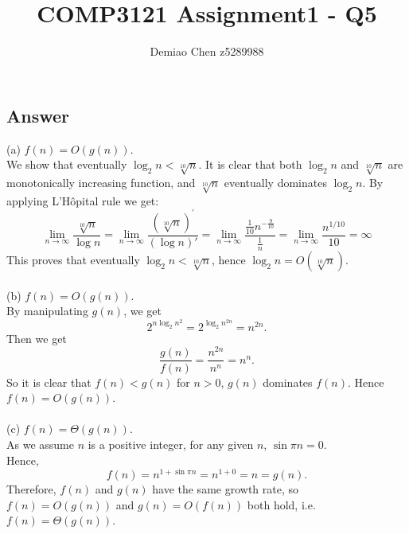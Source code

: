\documentclass[12pt]{article}
\title{COMP3121 Assignment1 - Q5}
\author{Demiao Chen z5289988}
\begin{document}
\maketitle
{}

\subsection*{Answer}
(a) $f(n) = O(g(n)).$\\
We show that eventually $\log_2{n} < \sqrt[10]{n}$. It is clear 
that both $\log_2{n}$ and $\sqrt[10]{n}$ are monotonically increasing function,
and $\sqrt[10]{n}$ eventually dominates $\log_2{n}$. By applying L’Hôpital rule
we get:
$$
\lim_{n \to \infty} \frac{\sqrt[10]{n}}{\log{n}} = 
\lim_{n \to \infty} \frac{(\sqrt[10]{n})^\prime}{(\log{n})'}=
\lim_{n \to \infty} \frac{\frac{1}{10}n^{-\frac{9}{10}}}{\frac{1}{n}}=
\lim_{n \to \infty} \frac{n^{1/10}}{10}=
\infty
$$
This proves that eventually $\log_2{n} < \sqrt[10]{n}$, hence 
$\log_2{n} = O(\sqrt[10]{n})$.
\\\\
(b) $f(n) = O(g(n))$. \\
By manipulating $g(n)$, we get $$
2^{n\log_2{n^2}} = 2^{\log_2{n^{2n}}} = n^{2n}.
$$
Then we get $$
\frac{g(n)}{f(n)} = \frac{n^{2n}}{n^n} = n^n.
$$
So it is clear that $f(n) < g(n)$ for $n>0$, $g(n)$ dominates $f(n)$.
Hence $f(n) = O(g(n))$.
\\\\
(c) $f(n) = \Theta (g(n))$. \\
As we assume $n$ is a positive integer, for any given $n$,
$\sin {\pi n} = 0$. \\
Hence, $$f(n) = n ^ {1 + \sin {\pi n}} = n ^ {1 + 0} = n = g(n).$$
Therefore, $f(n)$ and $g(n)$ have the same growth rate, so
$f(n) = O(g(n))$ and $g(n) = O(f(n))$ both hold, i.e. $f(n) = \Theta (g(n))$.

\end{document}
